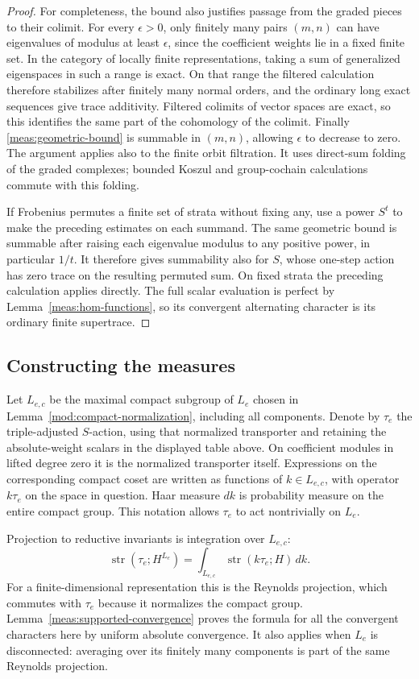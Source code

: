 \begin{proof}
For completeness, the bound also justifies passage from the graded pieces
to their colimit.  For every $\epsilon>0$, only finitely many pairs $(m,n)$
can have eigenvalues of modulus at least $\epsilon$, since the coefficient
weights lie in a fixed finite set.  In the category of locally finite
representations, taking a sum of generalized eigenspaces in such a range
is exact.  On that range the filtered calculation therefore stabilizes
after finitely many normal orders, and the ordinary long exact sequences
give trace additivity.  Filtered colimits of vector spaces are exact, so
this identifies the same part of the cohomology of the colimit.  Finally
\eqref{meas:geometric-bound} is summable in $(m,n)$, allowing
$\epsilon$ to decrease to zero.  The argument applies also to the finite
orbit filtration.  It uses direct-sum folding of the graded complexes;
bounded Koszul and group-cochain calculations commute with this folding.

If Frobenius permutes a finite set of strata without fixing any, use a
power $S^t$ to make the preceding estimates on each summand.  The same
geometric bound is summable after raising each eigenvalue modulus to
any positive power, in particular $1/t$.  It therefore gives summability
also for $S$, whose one-step action has zero trace on the resulting
permuted sum.  On fixed strata the
preceding calculation applies directly.  The full scalar evaluation is
perfect by Lemma~\ref{meas:hom-functions}, so its convergent alternating
character is its ordinary finite supertrace.
\end{proof}

\subsection{Constructing the measures}

Let $L_{e,c}$ be the maximal compact subgroup of $L_e$ chosen in
Lemma~\ref{mod:compact-normalization}, including all components.  Denote by
$\tau_e$ the triple-adjusted $S$-action, using that normalized transporter
and retaining the absolute-weight scalars in the displayed table above.
On coefficient modules in lifted degree zero it is the normalized
transporter itself.  Expressions on the corresponding compact coset are
written as functions of $k\in L_{e,c}$, with operator $k\tau_e$ on the
space in question.  Haar measure $dk$ is probability measure on the entire
compact group.  This notation allows $\tau_e$ to act nontrivially on $L_e$.

Projection to reductive invariants is integration over $L_{e,c}$:
\begin{equation}\label{meas:compact-projection}
 \operatorname{str}(\tau_e;H^{L_e})
 =\int_{L_{e,c}}\operatorname{str}(k\tau_e;H)\,dk.
\end{equation}
For a finite-dimensional representation this is the Reynolds projection,
which commutes with $\tau_e$ because it normalizes the compact group.
Lemma~\ref{meas:supported-convergence} proves the formula for all the
convergent characters here by uniform absolute convergence.  It also
applies when $L_e$ is disconnected: averaging over its finitely many
components is part of the same Reynolds projection.

